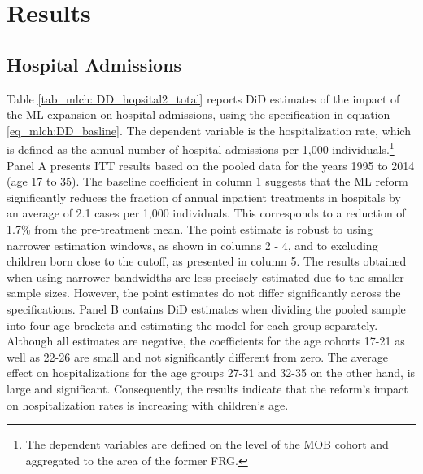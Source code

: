 


\section{Results}\label{sec_mlch:results}

\subsection{Hospital Admissions}


Table \ref{tab_mlch: DD_hopsital2_total} reports DiD estimates of the impact of the ML expansion on hospital admissions, using the specification in equation \ref{eq_mlch:DD_basline}. The dependent variable is the hospitalization rate, which is defined as the annual number of hospital admissions per 1,000 individuals.\footnote{The dependent variables are defined on the level of the MOB cohort and aggregated to the area of the former FRG.} Panel A presents ITT results based on the pooled data for the years 1995 to 2014 (age 17 to 35). The baseline coefficient in column 1 suggests that the ML reform significantly reduces the fraction of annual inpatient treatments in hospitals by an average of 2.1 cases per 1,000 individuals. This corresponds to a reduction of 1.7\% from the pre-treatment mean. The point estimate is robust to using narrower estimation windows, as shown in columns 2 - 4, and to excluding children born close to the cutoff, as presented in column 5. The results obtained when using narrower bandwidths are less precisely estimated due to the smaller sample sizes. However, the point estimates do not differ significantly across the specifications. Panel B contains DiD estimates when dividing the pooled sample into four age brackets and estimating the model for each group separately. Although all estimates are negative, the coefficients for the age cohorts 17-21 as well as 22-26 are small and not significantly different from zero. The average effect on hospitalizations for the age groups 27-31 and 32-35 on the other hand, is large and significant. Consequently, the results indicate that the reform's impact on hospitalization rates is increasing with children's age.



